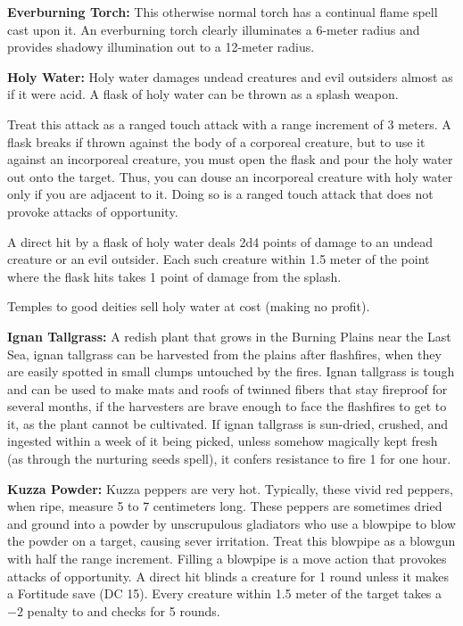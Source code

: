 \textbf{Everburning Torch:} This otherwise normal torch has a continual flame spell cast upon it. An everburning torch clearly illuminates a 6-meter radius and provides shadowy illumination out to a 12-meter radius.

\textbf{Holy Water:} Holy water damages undead creatures and evil outsiders almost as if it were acid. A flask of holy water can be thrown as a splash weapon.

Treat this attack as a ranged touch attack with a range increment of 3 meters. A flask breaks if thrown against the body of a corporeal creature, but to use it against an incorporeal creature, you must open the flask and pour the holy water out onto the target. Thus, you can douse an incorporeal creature with holy water only if you are adjacent to it. Doing so is a ranged touch attack that does not provoke attacks of opportunity.

A direct hit by a flask of holy water deals 2d4 points of damage to an undead creature or an evil outsider. Each such creature within 1.5 meter of the point where the flask hits takes 1 point of damage from the splash.

Temples to good deities sell holy water at cost (making no profit).

\textbf{Ignan Tallgrass:} A redish plant that grows in the Burning Plains near the Last Sea, ignan tallgrass can be harvested from the plains after flashfires, when they are easily spotted in small clumps untouched by the fires. Ignan tallgrass is tough and can be used to make mats and roofs of twinned fibers that stay fireproof for several months, if the harvesters are brave enough to face the flashfires to get to it, as the plant cannot be cultivated. If ignan tallgrass is sun-dried, crushed, and ingested within a week of it being picked, unless somehow magically kept fresh (as through the nurturing seeds spell), it confers resistance to fire 1 for one hour.

\textbf{Kuzza Powder:} Kuzza peppers are very hot. Typically, these vivid red peppers, when ripe, measure 5 to 7 centimeters long. These peppers are sometimes dried and ground into a powder by unscrupulous gladiators who use a blowpipe to blow the powder on a target, causing sever irritation. Treat this blowpipe as a blowgun with half the range increment. Filling a blowpipe is a move action that provokes attacks of opportunity. A direct hit blinds a creature for 1 round unless it makes a Fortitude save (DC 15). Every creature within 1.5 meter of the target takes a $-2$ penalty to  and  checks for 5 rounds.

